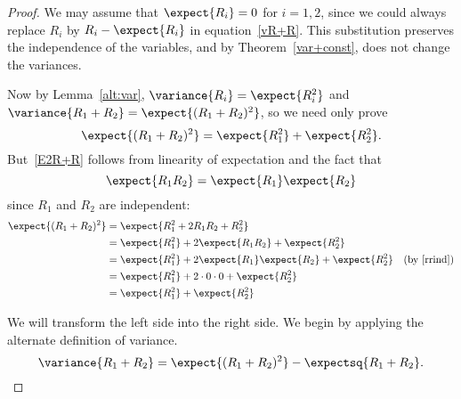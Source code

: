 \begin{proof}
We may assume that $\expect{R_i} = 0$ for $i=1,2$, since we could always
replace $R_i$ by $R_i-\expect{R_i}$ in equation~\eqref{vR+R}.  This
substitution preserves the independence of the variables, and by
Theorem~\ref{var+const}, does not change the variances.

Now by Lemma~\ref{alt:var}, $\variance{R_i} = \expect{R_i^2}$ and
$\variance{R_1+R_2} = \expect{(R_1+R_2)^2}$, so we need only prove
\begin{equation}\label{E2R+R}
\expect{(R_1+R_2)^2} = \expect{R_1^2} + \expect{R_2^2}.
\end{equation}
But~\eqref{E2R+R} follows from linearity of expectation and the fact that
\begin{equation}\label{rrind}
\expect{R_1R_2} = \expect{R_1}\expect{R_2}
\end{equation}
since $R_1$ and $R_2$ are independent:
\begin{align*}
\expect{(R_1+R_2)^2}
   & = \expect{R_1^2+2R_1R_2 +R_2^2}\\
   & = \expect{R_1^2}+2\expect{R_1R_2} +\expect{R_2^2}\\
   & = \expect{R_1^2}+2\expect{R_1}\expect{R_2} +\expect{R_2^2}
             & \text{(by~\eqref{rrind})}\\
   & = \expect{R_1^2}+2\cdot 0 \cdot 0 +\expect{R_2^2}\\
   & =  \expect{R_1^2} + \expect{R_2^2}
\end{align*}

\iffalse
We will transform the left side into the right side.  We begin by
applying the alternate definition of variance.
\[
\variance{R_1 + R_2} = \expect{(R_1 + R_2)^2} - \expectsq{R_1 + R_2}.
\]


\end{proof}

